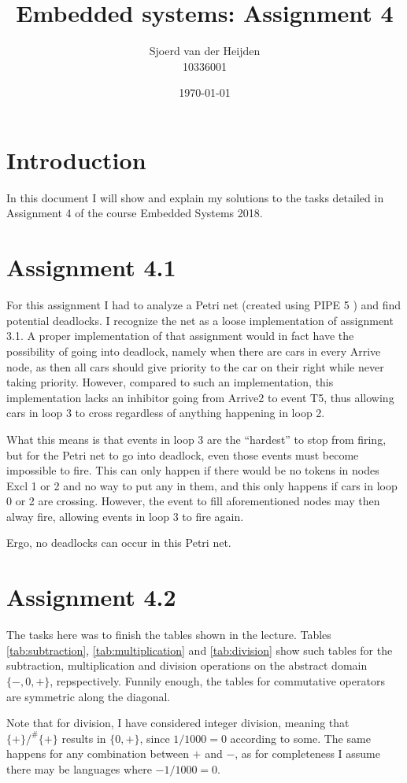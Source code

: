 \documentclass{article}
\title{Embedded systems: Assignment 4}
\date{\today}
\author{Sjoerd van der Heijden \\ 10336001}
\begin{document}
	\maketitle
	\section*{Introduction}
	\par In this document I will show and explain my solutions to the tasks detailed in Assignment 4 of the course Embedded Systems 2018.
	
	\section*{Assignment 4.1}
	\par For this assignment I had to analyze a Petri net (created using PIPE 5 \cite{dingle2009pipe2, bonet2007pipe}) and find potential deadlocks. I recognize the net as a loose implementation of assignment 3.1. A proper implementation of that assignment would in fact have the possibility of going into deadlock, namely when there are cars in every Arrive node, as then all cars should give priority to the car on their right while never taking priority. However, compared to such an implementation, this implementation lacks an inhibitor going from Arrive2 to event T5, thus allowing cars in loop 3 to cross regardless of anything happening in loop 2. 
	\par What this means is that events in loop 3 are the ``hardest'' to stop from firing,	but for the Petri net to go into deadlock, even those events must become impossible to fire. This can only happen if there would be no tokens in nodes Excl 1 or 2 and no way to put any in them, and this only happens if cars in loop 0 or 2 are crossing. However, the event to fill aforementioned nodes may then alway fire, allowing events in loop 3 to fire again.
	\par Ergo, no deadlocks can occur in this Petri net.
	
	
	\section*{Assignment 4.2}
	\par The tasks here was to finish the tables shown in the lecture. Tables  \ref{tab:subtraction}, \ref{tab:multiplication} and \ref{tab:division} show such tables for the subtraction, multiplication and division operations on the abstract domain $\{-,0,+\}$, repspectively. Funnily enough, the tables for commutative operators are symmetric along the diagonal.
	\par Note that for division, I have considered integer division, meaning that $ \{ + \} /^\# \{ + \}$ results in $\{0,+\}$, since $1/1000=0$ according to some. The same happens for any combination between $+$ and $-$, as for completeness I assume there may be languages where $-1/1000=0$.
	
\end{document}
